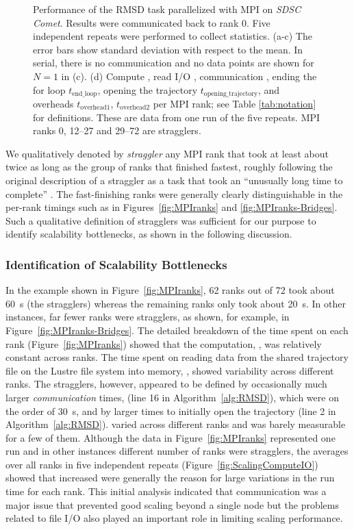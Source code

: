 \begin{figure}[!htb]
  \caption{Performance of the RMSD task parallelized with MPI on \emph{SDSC Comet}.
    Results were communicated back to rank 0.
    Five independent repeats were performed to collect statistics.
    (a-c) The error bars show standard deviation with respect to the mean.
    In serial, there is no communication and no data points are shown for $N=1$ in (c).
    (d) Compute \tcomp, read I/O \tIO, communication \tcomm, ending the for loop $t_{\text{end\_loop}}$, opening the trajectory $t_{\text{opening\_trajectory}}$, and overheads $t_{\text{overhead1}}$, $t_{\text{overhead2}}$ per MPI rank; see Table \ref{tab:notation} for definitions.
    These are data from one run of the five repeats.
    MPI ranks 0, 12--27 and 29--72 are stragglers.
  }
  \label{fig:MPIwithIO}
\end{figure}

We qualitatively denoted by \emph{straggler} any MPI rank that took at least about twice as long as the group of ranks that finished fastest, roughly following the original description of a straggler as a task that took an ``unusually long time to complete'' \cite{Dean2008}.
The fast-finishing ranks were generally clearly distinguishable in the per-rank timings such as in Figures~\ref{fig:MPIranks} and \ref{fig:MPIranks-Bridges}.
Such a qualitative definition of stragglers was sufficient for our purpose to identify scalability bottlenecks, as shown in the following discussion.

\subsubsection*{Identification of Scalability Bottlenecks}

In the example shown in Figure~\ref{fig:MPIranks}, 62 ranks out of 72 took about 60~s (the stragglers) whereas the remaining ranks only took about 20~s.
In other instances, far fewer ranks were stragglers, as shown, for example, in Figure~\ref{fig:MPIranks-Bridges}.
The detailed breakdown of the time spent on each rank (Figure~\ref{fig:MPIranks}) showed that the computation, \tcomp, was relatively constant across ranks. 
The time spent on reading data from the shared trajectory file on the Lustre file system into memory, \tIO, showed variability across different ranks. 
The stragglers, however, appeared to be defined by occasionally much larger \emph{communication} times, \tcomm (line 16 in Algorithm~\ref{alg:RMSD}), which were on the order of 30~s, and by larger times to initially open the trajectory (line 2 in Algorithm~\ref{alg:RMSD}).
\tcomm varied across different ranks and was barely measurable for a few of them.
Although the data in Figure~\ref{fig:MPIranks} represented one run and in other instances different number of ranks were stragglers, the averages over all ranks in five independent repeats (Figure~\ref{fig:ScalingComputeIO}) showed that increased \tcomm were generally the reason for large variations in the run time for each rank.
This initial analysis indicated that communication was a major issue that prevented good scaling beyond a single node but the problems related to file I/O also played an important role in limiting scaling performance.


